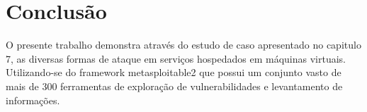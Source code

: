 \chapter{Conclusão}
O presente trabalho demonstra através do estudo de caso apresentado no capitulo 7, as diversas formas de ataque em serviços hospedados em máquinas virtuais. Utilizando-se do framework metasploitable2 que possui um conjunto vasto de mais de 300 ferramentas de exploração de vulnerabilidades e levantamento de informações.